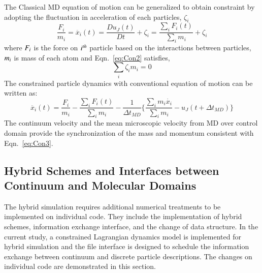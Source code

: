 \documentclass[preprint,12pt]{elsarticle}
\begin{document}
{\begin{equation}
 \label{eq:Lagrangian}
\end{equation}
\normalsize
The Classical MD equation of motion can be generalized to obtain constraint by adopting the fluctuation in acceleration of each particles, $\zeta_{i}$
\vspace{-.2em}
\begin{equation}
 \frac{F_{i}}{m_{i}} = \ddot{x_{i}}(t)  =   \frac{Du_{J}(t)}{Dt} + \zeta_{i} = \frac{\displaystyle\sum_{i}F_{i}(t)} {\displaystyle\sum_{i}m_{i}} +   \zeta_{i}
 \label{eq:Con2}
\end{equation}
\normalsize
where $\it F_{i}$ is the force on $\it i^{th}$ particle based on the interactions between particles,  $\it m_{i}$ is mass of each atom and  Eqn.~\ref{eq:Con2} satisfies,
\vspace{-.2em}
\begin{equation}
\displaystyle\sum_{i}\zeta_{i}m_{i} = 0
 \label{eq:Con2}
\end{equation}
\normalsize
The constrained particle dynamics with conventional equation of motion can be written as:
\vspace{-.2em}
\begin{equation}
 \ddot{x_{i}}(t) = \frac{F_{i}}{m_{i}} -  \frac{\displaystyle\sum_{i}F_{i}(t)} {\displaystyle\sum_{i}m_{i}} - \frac{1}{\Delta t_{MD}} \{  \frac{\displaystyle\sum_{i}m_{i}\dot{x_{i}}} {\displaystyle\sum_{i}m_{i}} - u_{J}(t + \Delta t_{MD})\}
 \label{eq:Con3}
\end{equation}
\normalsize
The continuum velocity and the mean microscopic velocity from MD over control domain provide the synchronization of the mass and momentum consistent with Eqn.~\ref{eq:Con3}.
}



\subsection{Hybrid Schemes and Interfaces between Continuum and Molecular Domains}
The hybrid simulation requires additional numerical treatments to be implemented on individual code. They include the implementation of hybrid schemes, information exchange interface, and the change of data structure. In the current study, a constrained Lagrangian dynamics model is implemented for hybrid simulation and the file interface is designed to schedule the information exchange between continuum and discrete particle descriptions. The changes on individual code are demonstrated in this section.
\end{document}
